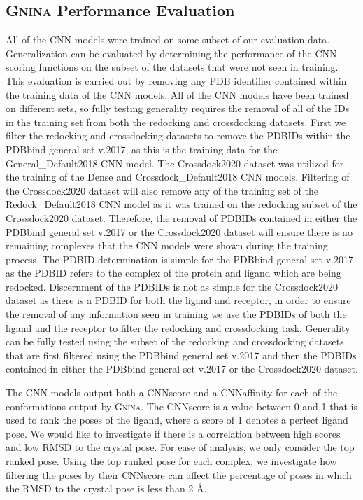 \documentclass[journal=jcisd8,manuscript=article]{achemso}
\begin{document}
\subsection{\textsc{Gnina} Performance Evaluation}
All of the CNN models were trained on some subset of our evaluation data. Generalization can be evaluated by determining the performance of the CNN scoring functions on the subset of the datasets that were not seen in training. This evaluation is carried out by removing any PDB identifier contained within the training data of the CNN models. All of the CNN models have been trained on different sets, so fully testing generality requires the removal of all of the IDs in the training set from both the redocking and crossdocking datasets. First we filter the redocking and crossdocking datasets to remove the PDBIDs within the PDBbind general set v.2017, as this is the training data for the General\_Default2018 CNN model. The Crossdock2020 dataset was utilized for the training of the Dense and Crossdock\_Default2018 CNN models. Filtering of the Crossdock2020 dataset will also remove any of the training set of the Redock\_Default2018 CNN model as it was trained on the redocking subset of the Crossdock2020 dataset. Therefore, the removal of PDBIDs contained in either the PDBbind general set v.2017 or the Crossdock2020 dataset will ensure there is no remaining complexes that the CNN models were shown during the training process. The PDBID determination is simple for the PDBbind general set v.2017 as the PDBID refers to the complex of the protein and ligand which are being redocked. Discernment of the PDBIDs is not as simple for the Crossdock2020 dataset as there is a PDBID for both the ligand and receptor, in order to ensure the removal of any information seen in training we use the PDBIDs of both the ligand and the receptor to filter the redocking and crossdocking task. Generality can be fully tested using the subset of the redocking and crossdocking datasets that are first filtered using the PDBbind general set v.2017 and then the PDBIDs contained in either the PDBbind general set v.2017 or the Crossdock2020 dataset. 

The CNN models output both a CNNscore and a CNNaffinity for each of the conformations output by \textsc{Gnina}. The CNNscore is a value between 0 and 1 that is used to rank the poses of the ligand, where a score of 1 denotes a perfect ligand pose. We would like to investigate if there is a correlation between high scores and low RMSD to the crystal pose. For ease of analysis, we only consider the top ranked pose. Using the top ranked pose for each complex, we investigate how filtering the poses by their CNNscore can affect the percentage of poses in which the RMSD to the crystal pose is less than 2 \AA.
\end{document}
